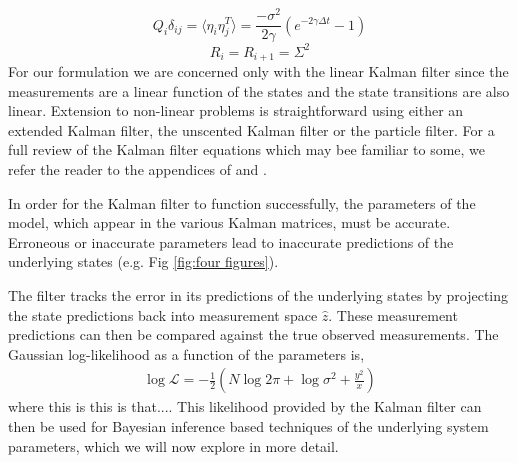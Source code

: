 \documentclass[fleqn,usenatbib,useAMS]{mnras}
\begin{document}
\begin{equation}
	Q_i  \delta_{ij}= \langle \eta_i \eta_j^T \rangle = \frac{- \sigma^2}{2 \gamma} \left( e^{-2 \gamma \Delta t} -1\right)
\end{equation}
\begin{equation}
	R_i = R_{i+1} = \Sigma^2
\end{equation}
For our formulation we are concerned only with the linear Kalman filter since the measurements are a linear function of the states and the state transitions are also linear. Extension to non-linear problems is straightforward using either an extended Kalman filter, the unscented Kalman filter or the particle filter. For a full review of the  Kalman filter equations which may bee familiar to some, we refer the reader to the appendices of \cite{Melatos2023} and  \cite{Meyers2021}. \newline 



\noindent In order for the Kalman filter to function successfully, the parameters of the model, which appear in the various Kalman matrices, must be accurate. Erroneous or inaccurate parameters lead to inaccurate predictions of the underlying states (e.g. Fig \ref{fig:four figures}). 





The filter tracks the error in its predictions of the underlying states by projecting the state predictions back into measurement space $\hat{z}$. These measurement predictions can then be compared against the true observed measurements. The Gaussian log-likelihood as a function of the parameters is,
\begin{eqnarray}
	\log \mathcal{L} =  -\frac{1}{2} (N \log 2 \pi + \log \sigma^2 + \frac{y^2}{x})
\end{eqnarray}
where this is this is that....
This likelihood provided by the Kalman filter can then be used for Bayesian inference based techniques of the underlying system parameters, which we will now explore in more detail.  
\end{document}
